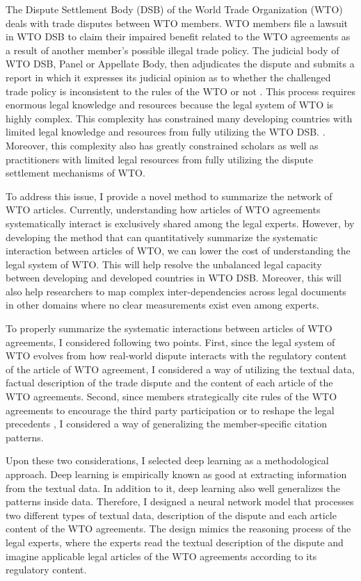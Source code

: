 The Dispute Settlement Body (DSB) of
the World Trade Organization (WTO) deals
with trade disputes between WTO members.
WTO members file a lawsuit in WTO DSB to
claim their impaired benefit related to the WTO agreements as a result of another member's possible illegal trade policy.
The judicial body of WTO DSB, Panel or Appellate Body, then adjudicates the dispute and submits a report in which it expresses
its judicial opinion as to whether the challenged
trade policy is inconsistent to the rules of the WTO or not \citep{world2017handbook}.
This process requires enormous legal knowledge and resources because the legal system of WTO is highly complex.
This complexity has constrained many developing countries with limited legal knowledge and resources from fully utilizing the WTO DSB.
\citep{busch_reinhardt_shaffer_2009, dev_busch, shaffer_2006}.
Moreover, this complexity also has greatly constrained scholars as well as practitioners with limited legal resources from fully utilizing the dispute settlement mechanisms of WTO. 



To address this issue, I provide a novel method to summarize the network of WTO articles.
Currently, understanding how articles of WTO agreements systematically interact is exclusively shared among the legal experts.
However, by developing the method that can quantitatively summarize the systematic interaction between articles of WTO,
we can lower the cost of understanding the legal system of WTO. This will help resolve the unbalanced legal capacity between developing and developed countries in WTO DSB.
Moreover, this will also help researchers to map complex inter-dependencies across legal documents in other domains where no clear measurements exist even among experts.

To properly summarize the systematic interactions between articles of WTO agreements, I considered following two points.
First, since the legal system of WTO evolves from how real-world dispute interacts with the regulatory content of the article of WTO agreement,
I considered a way of utilizing the textual data, factual description of the trade dispute and the content of each article of the WTO agreements.
Second, since members strategically cite rules of the WTO agreements to encourage
the third party participation \citep{who_gets} or to reshape the legal precedents \citep{pelc, latent},
I considered a way of generalizing the member-specific citation patterns.

Upon these two considerations, I selected deep learning as a methodological approach.
Deep learning is empirically known as good at extracting information from the textual data.
In addition to it, deep learning also well generalizes the patterns inside data.
Therefore, I designed a neural network model that processes two different types of textual data,
description of the dispute and each article content of the WTO agreements.
The design mimics the reasoning process of the legal experts,
where the experts read
the textual description of the dispute and imagine applicable legal articles of the WTO agreements according to its regulatory content.

